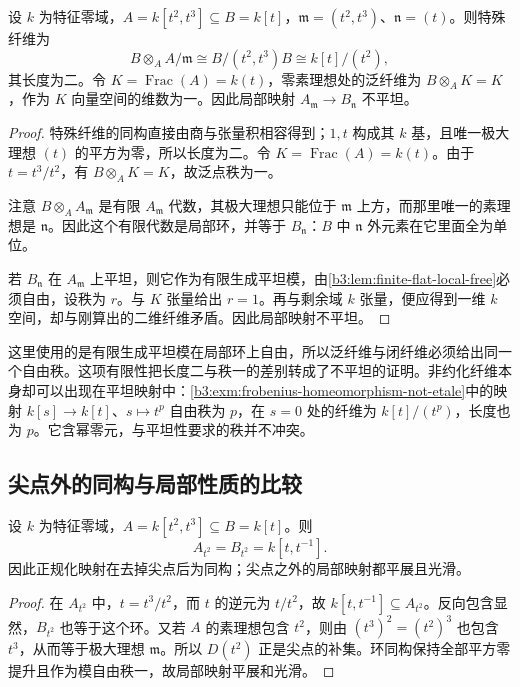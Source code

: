 \begin{proposition}\label{b3:prop:cusp-fiber-nonflat}
	设 \(k\) 为特征零域，\(A=k[t^2,t^3]\subseteq B=k[t]\)，\(\mathfrak m=(t^2,t^3)\)、\(\mathfrak n=(t)\)。则特殊纤维为
	\[
		B\otimes_A A/\mathfrak m \cong B/(t^2,t^3)B \cong k[t]/(t^2),
	\]
	其长度为二。令 \(K=\operatorname{Frac}(A)=k(t)\)，零素理想处的泛纤维为 \(B\otimes_AK=K\)，作为 \(K\) 向量空间的维数为一。因此局部映射 \(A_{\mathfrak m}\to B_{\mathfrak n}\) 不平坦。
\end{proposition}
\begin{proof}
	特殊纤维的同构直接由商与张量积相容得到；\(1,t\) 构成其 \(k\) 基，且唯一极大理想 \((t)\) 的平方为零，所以长度为二。令 \(K=\operatorname{Frac}(A)=k(t)\)。由于 \(t=t^3/t^2\)，有 \(B\otimes_AK=K\)，故泛点秩为一。

	注意 \(B\otimes_AA_{\mathfrak m}\) 是有限 \(A_{\mathfrak m}\) 代数，其极大理想只能位于 \(\mathfrak m\) 上方，而那里唯一的素理想是 \(\mathfrak n\)。因此这个有限代数是局部环，并等于 \(B_{\mathfrak n}\)：\(B\) 中 \(\mathfrak n\) 外元素在它里面全为单位。

	若 \(B_{\mathfrak n}\) 在 \(A_{\mathfrak m}\) 上平坦，则它作为有限生成平坦模，由\cref{b3:lem:finite-flat-local-free}必须自由，设秩为 \(r\)。与 \(K\) 张量给出 \(r=1\)。再与剩余域 \(k\) 张量，便应得到一维 \(k\) 空间，却与刚算出的二维纤维矛盾。因此局部映射不平坦。
\end{proof}

这里使用的是有限生成平坦模在局部环上自由，所以泛纤维与闭纤维必须给出同一个自由秩。这项有限性把长度二与秩一的差别转成了不平坦的证明。非约化纤维本身却可以出现在平坦映射中：\cref{b3:exm:frobenius-homeomorphism-not-etale}中的映射 \(k[s]\to k[t]\)、\(s\mapsto t^p\) 自由秩为 \(p\)，在 \(s=0\) 处的纤维为 \(k[t]/(t^p)\)，长度也为 \(p\)。它含幂零元，与平坦性要求的秩并不冲突。

\subsection{尖点外的同构与局部性质的比较}
\label{b3:subsec:2304:06}
\label{b3:subsec:cusp-normalization-off-origin}

\begin{proposition}\label{b3:prop:cusp-isomorphism-off-origin}
	设 \(k\) 为特征零域，\(A=k[t^2,t^3]\subseteq B=k[t]\)。则
	\[
		A_{t^2}=B_{t^2}=k[t,t^{-1}].
	\]
	因此正规化映射在去掉尖点后为同构；尖点之外的局部映射都平展且光滑。
\end{proposition}
\begin{proof}
	在 \(A_{t^2}\) 中，\(t=t^3/t^2\)，而 \(t\) 的逆元为 \(t/t^2\)，故 \(k[t,t^{-1}]\subseteq A_{t^2}\)。反向包含显然，\(B_{t^2}\) 也等于这个环。又若 \(A\) 的素理想包含 \(t^2\)，则由 \((t^3)^2=(t^2)^3\) 也包含 \(t^3\)，从而等于极大理想 \(\mathfrak m\)。所以 \(D(t^2)\) 正是尖点的补集。环同构保持全部平方零提升且作为模自由秩一，故局部映射平展和光滑。
\end{proof}

